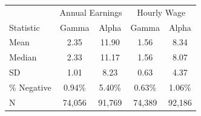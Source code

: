 \begin{tabular}{lcc|cc}
\hline\hline
 & \multicolumn{2}{c|}{Annual Earnings} & \multicolumn{2}{c}{Hourly Wage} \\
Statistic & Gamma & Alpha & Gamma & Alpha \\
\hline
Mean&2.35&11.90&1.56&8.34\\
Median&2.33&11.17&1.56&8.07\\
SD&1.01&8.23&0.63&4.37\\
\hline \% Negative&0.94\%&5.40\%&0.63\%&1.06\%\\
N&74,056&91,769&74,389&92,186\\
\hline\hline
\end{tabular}
